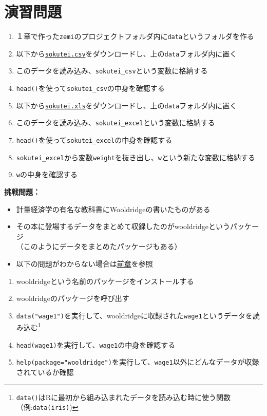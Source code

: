 \documentclass[
]{book}
\providecommand{\tightlist}{%
  \setlength{\itemsep}{0pt}\setlength{\parskip}{0pt}}
\begin{document}
\hypertarget{ux6f14ux7fd2ux554fux984c-3}{%
\section{演習問題}\label{ux6f14ux7fd2ux554fux984c-3}}

\begin{enumerate}
\def\labelenumi{\arabic{enumi}.}
\tightlist
\item
  １章で作った\texttt{zemi}のプロジェクトフォルダ内に\texttt{data}というフォルダを作る
\item
  以下から\href{https://www.dropbox.com/s/8fy2dbnurinract/shitaisokutei.csv?dl=0}{\texttt{sokutei.csv}}をダウンロードし、上の\texttt{data}フォルダ内に置く
\item
  このデータを読み込み、\texttt{sokutei\_csv}という変数に格納する
\item
  \texttt{head()}を使って\texttt{sokutei\_csv}の中身を確認する
\item
  以下から\href{https://www.dropbox.com/s/m4m4etyd81pnpq6/sokutei.xls?dl=0}{\texttt{sokutei.xls}}をダウンロードし、上の\texttt{data}フォルダ内に置く
\item
  このデータを読み込み、\texttt{sokutei\_excel}という変数に格納する
\item
  \texttt{head()}を使って\texttt{sokutei\_excel}の中身を確認する
\item
  \texttt{sokutei\_excel}から変数\texttt{weight}を抜き出し、\texttt{w}という新たな変数に格納する
\item
  \texttt{w}の中身を確認する
\end{enumerate}

\textbf{挑戦問題：}

\begin{itemize}
\tightlist
\item
  計量経済学の有名な教科書にWooldridgeの書いたものがある\\
\item
  その本に登場するデータをまとめて収録したのがwooldridgeというパッケージ\\
  （このようにデータをまとめたパッケージもある）\\
\item
  以下の問題がわからない場合は\protect\hyperlink{ux30d1ux30c3ux30b1ux30fcux30b8}{前章}を参照
\end{itemize}

\begin{enumerate}
\def\labelenumi{\arabic{enumi}.}
\tightlist
\item
  wooldridgeという名前のパッケージをインストールする
\item
  wooldridgeのパッケージを呼び出す
\item
  \texttt{data("wage1")}を実行して、wooldridgeに収録された\texttt{wage1}というデータを読み込む\footnote{\texttt{data()}はRに最初から組み込まれたデータを読み込む時に使う関数（例:\texttt{data(iris)})}
\item
  \texttt{head(wage1)}を実行して、\texttt{wage1}の中身を確認する
\item
  \texttt{help(package="wooldridge")}を実行して、\texttt{wage1}以外にどんなデータが収録されているか確認
\end{enumerate}
\end{document}
